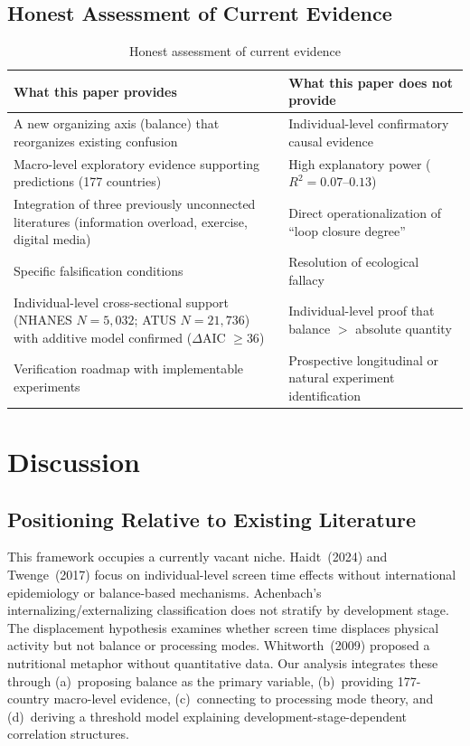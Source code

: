 \documentclass[a4paper,11pt,titlepage]{article}
\begin{document}
\subsection{Honest Assessment of Current Evidence}

\begin{table}[htbp]
\centering
\caption{Honest assessment of current evidence}
\label{tab:honest}
\small
\begin{tabular}{p{6.5cm}p{6.5cm}}
\toprule
What this paper provides & What this paper does not provide \\
\midrule
A new organizing axis (balance) that reorganizes existing confusion & Individual-level confirmatory causal evidence \\[3pt]
Macro-level exploratory evidence supporting predictions (177 countries) & High explanatory power ($R^2 = 0.07$--$0.13$) \\[3pt]
Integration of three previously unconnected literatures (information overload, exercise, digital media) & Direct operationalization of ``loop closure degree'' \\[3pt]
Specific falsification conditions & Resolution of ecological fallacy \\[3pt]
Individual-level cross-sectional support (NHANES $N=5{,}032$; ATUS $N=21{,}736$) with additive model confirmed ($\Delta$AIC $\geq 36$) & Individual-level proof that balance $>$ absolute quantity \\[3pt]
Verification roadmap with implementable experiments & Prospective longitudinal or natural experiment identification \\
\bottomrule
\end{tabular}
\end{table}


\section{Discussion}\label{sec:discussion}

\subsection{Positioning Relative to Existing Literature}

This framework occupies a currently vacant niche. Haidt~(2024) and Twenge~(2017) focus on individual-level screen time effects without international epidemiology or balance-based mechanisms. Achenbach's internalizing/externalizing classification does not stratify by development stage. The displacement hypothesis examines whether screen time displaces physical activity but not balance or processing modes. Whitworth~(2009) proposed a nutritional metaphor without quantitative data. Our analysis integrates these through (a)~proposing balance as the primary variable, (b)~providing 177-country macro-level evidence, (c)~connecting to processing mode theory, and (d)~deriving a threshold model explaining development-stage-dependent correlation structures.
\end{document}
